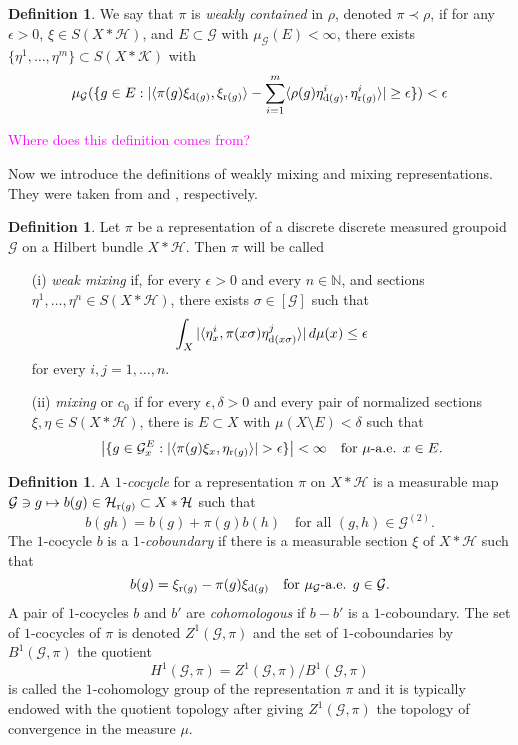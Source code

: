 \documentclass[a4paper,11pt]{article}
\numberwithin{equation}{section}
\theoremstyle{definition}
\newtheorem{defn}[thm]{Definition}
\theoremstyle{remark}
\numberwithin{equation}{section}
\newcommand{\rG}{\mathcal{G}}
\def\N{\mathbb{N}}
\def\H{\mathcal H}
\def\K{\mathcal K}
\def\r{{\rm r}}
\def\d{{\rm d}}
\def\si{\sigma}
\def\<{\langle}
\def\>{\rangle}
\numberwithin{equation}{section}
\begin{document}
\begin{defn}\label{weakcont}
We say that $\pi$ is {\it weakly contained} in $\rho$, denoted $\pi \prec \rho$, if for any $\epsilon > 0$, $\xi \in S(X \ast \H)$, and $E \subset \rG$ with $\mu_\rG(E) < \infty$, there exists $\{\eta^1, \dots, \eta^m\} \subset S(X \ast \K)$ with
$$
\mu_\rG(\{g\in E : |\< \pi(g)\xi_{\d(g)}, \xi_{\r(g)} \> - \sum_{i = 1}^m \< \rho(g)\eta^i_{\d(g)}, \eta^i_{\r(g)} \>| \ge \epsilon\}) < \epsilon  
$$ 
\end{defn}

\textcolor{magenta}{Where does this definition comes from?}


Now we introduce the definitions of weakly mixing and mixing representations. They were taken from \cite[Definition 3.10]{gardella:17} and \cite[Definition 4.4]{kida:17}, respectively.

\begin{defn}\label{mixingreps}
  Let $\pi$ be a representation of a discrete discrete measured groupoid $\rG$ on a Hilbert bundle $X\ast \H$. Then $\pi$ will be called \begin{enumerate}
      \item[(i)]  \textit{weak mixing} if, for every $\epsilon >0$ and every $n\in \N$, and sections $ \eta^1,\ldots, \eta^n\in S(X\ast\H) $, there exists $ \si\in [\rG] $ such that
\[
  \int_{X} |\langle\eta^i_x,\pi(x\si)\eta_{\d(x\sigma)}^j\rangle| \dd{\mu(x)} \leq \epsilon
\]
for every $i,j=1,\ldots,n$.
\item[(ii)] {\it mixing} or $c_0$ if 
for every $\epsilon, \delta > 0$ and every pair of normalized sections $\xi, \eta \in S(X \ast \H)$, there is $E \subset X$ with $\mu(X \setminus E) < \delta$ such that 
$$
\left|\{g \in \rG^{E}_x : |\<\pi(g)\xi_x, \eta_{\r(g)}\>| > \epsilon\}\right| < \infty  \quad \text{for $\mu$-a.e. $x \in E$.}
$$
  \end{enumerate} 
\end{defn}


\begin{defn}\label{cohom}
    A {\it $1$-cocycle} for a representation $\pi$ on $X \ast \H$ is a measurable map $\rG\ni g \mapsto b(g) \in \H_{\r(g)}\subset X\ast \H$ such that 
\begin{equation}\label{cocycle} 
b(gh) = b(g) + \pi(g)b(h) \quad \text{for all } (g,h)\in \rG^{(2)}.
\end{equation} The $1$-cocycle $b$ is a {\it $1$-coboundary} if there is a measurable section $\xi$ of $X \ast \H$ such that 
\begin{equation}\label{cobound} 
b(g) = \xi_{\r(g)} - \pi(g)\xi_{\d(g)} \quad \textup{for  $\mu_\rG$-a.e. $g\in\rG$}.
\end{equation}
A pair of $1$-cocycles $b$ and $b'$ are {\it cohomologous} if $b - b'$ is a $1$-coboundary. The set of $1$-cocycles of $\pi$ is denoted $Z^1(\rG,\pi)$ and the set of $1$-coboundaries by $B^1(\rG,\pi)$ the quotient 
$$
H^1(\rG,\pi)=Z^1(\rG,\pi)/B^1(\rG,\pi)
$$ is called the $1$-cohomology group of the representation $\pi$ and it is typically endowed with the quotient topology after giving $Z^1(\rG,\pi)$ the topology of convergence in the measure $\mu$.
\end{defn}
\end{document}
